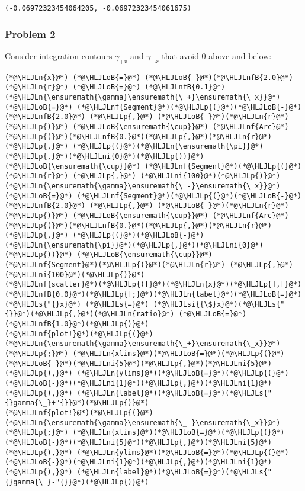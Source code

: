 \documentclass[12pt,landscape]{article}
\newcommand{\HLJLn}[1]{#1}
\newcommand{\HLJLnf}[1]{\textcolor[RGB]{66,102,213}{#1}}
\newcommand{\HLJLs}[1]{\textcolor[RGB]{201,61,57}{#1}}
\newcommand{\HLJLsi}[1]{#1}
\newcommand{\HLJLnfB}[1]{\textcolor[RGB]{59,151,46}{#1}}
\newcommand{\HLJLni}[1]{\textcolor[RGB]{59,151,46}{#1}}
\newcommand{\HLJLoB}[1]{\textcolor[RGB]{102,102,102}{\textbf{#1}}}
\newcommand{\HLJLp}[1]{#1}
\begin{document}
{\begin{lstlisting}
(-0.06972323454064205, -0.06972323454061675)
\end{lstlisting}


\subsubsection{Problem 2}
Consider integration contours $\gamma_{+x}$ and $\gamma_{-x}$ that avoid $0$ above and below:


\begin{lstlisting}
(*@\HLJLn{x}@*) (*@\HLJLoB{=}@*) (*@\HLJLoB{-}@*)(*@\HLJLnfB{2.0}@*)
(*@\HLJLn{r}@*) (*@\HLJLoB{=}@*) (*@\HLJLnfB{0.1}@*)
(*@\HLJLn{\ensuremath{\gamma}\ensuremath{\_+}\ensuremath{\_x}}@*) (*@\HLJLoB{=}@*) (*@\HLJLnf{Segment}@*)(*@\HLJLp{(}@*)(*@\HLJLoB{-}@*)(*@\HLJLnfB{2.0}@*) (*@\HLJLp{,}@*) (*@\HLJLoB{-}@*)(*@\HLJLn{r}@*)(*@\HLJLp{)}@*) (*@\HLJLoB{\ensuremath{\cup}}@*) (*@\HLJLnf{Arc}@*)(*@\HLJLp{(}@*)(*@\HLJLnfB{0.}@*)(*@\HLJLp{,}@*)(*@\HLJLn{r}@*)(*@\HLJLp{,}@*) (*@\HLJLp{(}@*)(*@\HLJLn{\ensuremath{\pi}}@*)(*@\HLJLp{,}@*)(*@\HLJLni{0}@*)(*@\HLJLp{))}@*) (*@\HLJLoB{\ensuremath{\cup}}@*) (*@\HLJLnf{Segment}@*)(*@\HLJLp{(}@*)(*@\HLJLn{r}@*) (*@\HLJLp{,}@*) (*@\HLJLni{100}@*)(*@\HLJLp{)}@*)
(*@\HLJLn{\ensuremath{\gamma}\ensuremath{\_-}\ensuremath{\_x}}@*) (*@\HLJLoB{=}@*) (*@\HLJLnf{Segment}@*)(*@\HLJLp{(}@*)(*@\HLJLoB{-}@*)(*@\HLJLnfB{2.0}@*) (*@\HLJLp{,}@*) (*@\HLJLoB{-}@*)(*@\HLJLn{r}@*)(*@\HLJLp{)}@*) (*@\HLJLoB{\ensuremath{\cup}}@*) (*@\HLJLnf{Arc}@*)(*@\HLJLp{(}@*)(*@\HLJLnfB{0.}@*)(*@\HLJLp{,}@*)(*@\HLJLn{r}@*)(*@\HLJLp{,}@*) (*@\HLJLp{(}@*)(*@\HLJLoB{-}@*)(*@\HLJLn{\ensuremath{\pi}}@*)(*@\HLJLp{,}@*)(*@\HLJLni{0}@*)(*@\HLJLp{))}@*) (*@\HLJLoB{\ensuremath{\cup}}@*) (*@\HLJLnf{Segment}@*)(*@\HLJLp{(}@*)(*@\HLJLn{r}@*) (*@\HLJLp{,}@*) (*@\HLJLni{100}@*)(*@\HLJLp{)}@*)
(*@\HLJLnf{scatter}@*)(*@\HLJLp{([}@*)(*@\HLJLn{x}@*)(*@\HLJLp{],[}@*)(*@\HLJLnfB{0.0}@*)(*@\HLJLp{];}@*)(*@\HLJLn{label}@*)(*@\HLJLoB{=}@*)(*@\HLJLs{"{}x}@*) (*@\HLJLs{=}@*) (*@\HLJLsi{{\$}x}@*)(*@\HLJLs{"{}}@*)(*@\HLJLp{,}@*)(*@\HLJLn{ratio}@*) (*@\HLJLoB{=}@*) (*@\HLJLnfB{1.0}@*)(*@\HLJLp{)}@*)
(*@\HLJLnf{plot!}@*)(*@\HLJLp{(}@*)(*@\HLJLn{\ensuremath{\gamma}\ensuremath{\_+}\ensuremath{\_x}}@*) (*@\HLJLp{;}@*) (*@\HLJLn{xlims}@*)(*@\HLJLoB{=}@*)(*@\HLJLp{(}@*)(*@\HLJLoB{-}@*)(*@\HLJLni{5}@*)(*@\HLJLp{,}@*)(*@\HLJLni{5}@*)(*@\HLJLp{),}@*) (*@\HLJLn{ylims}@*)(*@\HLJLoB{=}@*)(*@\HLJLp{(}@*)(*@\HLJLoB{-}@*)(*@\HLJLni{1}@*)(*@\HLJLp{,}@*)(*@\HLJLni{1}@*)(*@\HLJLp{),}@*) (*@\HLJLn{label}@*)(*@\HLJLoB{=}@*)(*@\HLJLs{"{}gamma{\_}+"{}}@*)(*@\HLJLp{)}@*)
(*@\HLJLnf{plot!}@*)(*@\HLJLp{(}@*)(*@\HLJLn{\ensuremath{\gamma}\ensuremath{\_-}\ensuremath{\_x}}@*)(*@\HLJLp{;}@*) (*@\HLJLn{xlims}@*)(*@\HLJLoB{=}@*)(*@\HLJLp{(}@*)(*@\HLJLoB{-}@*)(*@\HLJLni{5}@*)(*@\HLJLp{,}@*)(*@\HLJLni{5}@*)(*@\HLJLp{),}@*) (*@\HLJLn{ylims}@*)(*@\HLJLoB{=}@*)(*@\HLJLp{(}@*)(*@\HLJLoB{-}@*)(*@\HLJLni{1}@*)(*@\HLJLp{,}@*)(*@\HLJLni{1}@*)(*@\HLJLp{),}@*) (*@\HLJLn{label}@*)(*@\HLJLoB{=}@*)(*@\HLJLs{"{}gamma{\_}-"{}}@*)(*@\HLJLp{)}@*)
\end{lstlisting}

}
\end{document}
